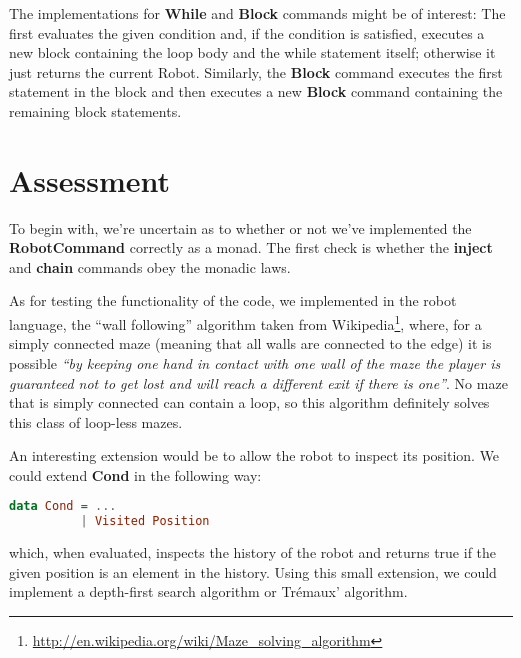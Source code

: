 \documentclass[a4paper]{article}
\newcommand{\func}[1]{\textbf{\ttfamily #1}\xspace}
\begin{document}
The implementations for \func{While} and \func{Block} commands might be of interest: The first evaluates the given condition and, if the condition is satisfied, executes a new block containing the loop body and the while statement itself; otherwise it just returns the current Robot. Similarly, the \func{Block} command executes the first statement in the block and then executes a new \func{Block} command containing the remaining block statements.

\newpage
\section{Assessment}


To begin with, we're uncertain as to whether or not we've implemented the \func{RobotCommand} correctly as a monad. The first check is whether the \func{inject} and \func{chain} commands obey the monadic laws.

As for testing the functionality of the code, we implemented in the
robot language, the ``wall following'' algorithm taken from
Wikipedia\footnote{\url{http://en.wikipedia.org/wiki/Maze_solving_algorithm}},
where, for a simply connected maze (meaning that all walls are
connected to the edge) it is possible \emph{``by keeping one hand in
  contact with one wall of the maze the player is guaranteed not to
  get lost and will reach a different exit if there is one''}. No maze
that is simply connected can contain a loop, so this algorithm
definitely solves this class of loop-less mazes.


An interesting extension would be to allow the robot to inspect its
position. We could extend \func{Cond} in the following way:
\begin{lstlisting}[language=haskell]
data Cond = ...
          | Visited Position
\end{lstlisting}
which, when evaluated, inspects the history of the robot and returns
true if the given position is an element in the history. Using this
small extension, we could implement a depth-first search algorithm or
Trémaux' algorithm.
\end{document}
